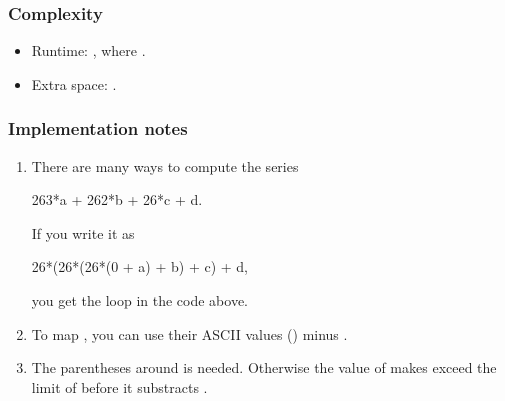 \documentclass[letterpaper,12pt,english]{book}
\begin{document}
\subsubsection{Complexity}
\label{\detokenize{Mathematics/09_MTH_171_Excel_Sheet_Collumn_Number:complexity}}\begin{itemize}
\item {} 
\sphinxAtStartPar
Runtime: , where .

\item {} 
\sphinxAtStartPar
Extra space: .

\end{itemize}


\subsubsection{Implementation notes}
\label{\detokenize{Mathematics/09_MTH_171_Excel_Sheet_Collumn_Number:implementation-notes}}\begin{enumerate}
%
\item {} 
\sphinxAtStartPar
There are many ways to compute the series

\begin{sphinxVerbatim}[commandchars=\\\{\}]
26\PYGZca{}3*a + 26\PYGZca{}2*b + 26*c + d.
\end{sphinxVerbatim}

\sphinxAtStartPar
If you write it as

\begin{sphinxVerbatim}[commandchars=\\\{\}]
26*(26*(26*(0 + a) + b) + c) + d,
\end{sphinxVerbatim}

\sphinxAtStartPar
you get the loop in the code above.

\item {} 
\sphinxAtStartPar
To map , you can use their ASCII values () minus .

\item {} 
\sphinxAtStartPar
The parentheses around  is needed. Otherwise the value of  makes  exceed the limit of  before it substracts .

\end{enumerate}
\end{document}

